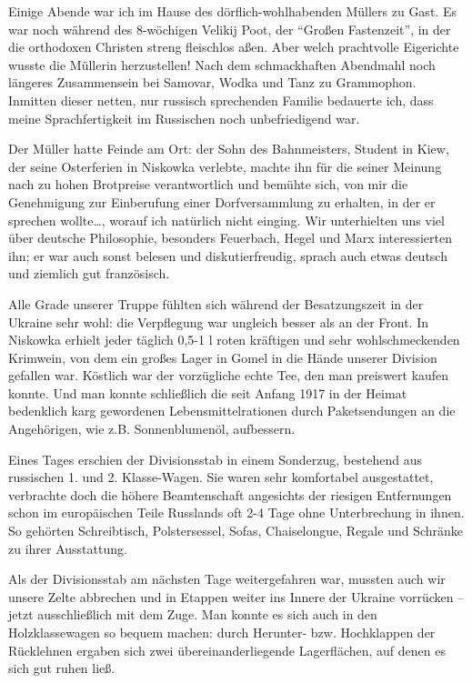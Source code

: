 Einige Abende war ich im Hause des dörflich-wohlhabenden Müllers zu Gast. Es war noch während des 8-wöchigen Velikij Poot, der \enquote{Großen Fastenzeit}, in der die orthodoxen Christen streng fleischlos aßen. Aber welch prachtvolle Eigerichte wusste die Müllerin herzustellen! Nach dem schmackhaften Abendmahl noch längeres Zusammensein bei Samovar, Wodka und Tanz zu Grammophon. Inmitten dieser netten, nur russisch sprechenden Familie bedauerte ich, dass meine Sprachfertigkeit im Russischen noch unbefriedigend war.

Der Müller hatte Feinde am Ort: der Sohn des Bahnmeisters, Student in Kiew, der seine Osterferien in Niskowka verlebte, machte ihn für die seiner Meinung nach zu hohen Brotpreise verantwortlich und bemühte sich, von mir die Genehmigung zur Einberufung einer Dorfversammlung zu erhalten, in der er sprechen wollte\dots, worauf ich natürlich nicht einging. Wir unterhielten uns viel über deutsche Philosophie, besonders Feuerbach, Hegel und Marx interessierten ihn; er war auch sonst belesen und diskutierfreudig, sprach auch etwas deutsch und ziemlich gut französisch.

Alle Grade unserer Truppe fühlten sich während der Besatzungszeit in der Ukraine sehr wohl: die Verpflegung war ungleich besser als an der Front. In Niskowka erhielt jeder täglich 0,5-1 l roten kräftigen und sehr wohlschmeckenden Krimwein, von dem ein großes Lager in Gomel in die Hände unserer Division gefallen war. Köstlich war der vorzügliche echte Tee, den man preiswert kaufen konnte. Und man konnte schließlich die seit Anfang 1917 in der Heimat bedenklich karg gewordenen Lebensmittelrationen durch Paketsendungen an die Angehörigen, wie z.B. Sonnenblumenöl, aufbessern.

Eines Tages erschien der Divisionsstab in einem Sonderzug, bestehend aus russischen 1. und 2. Klasse-Wagen. Sie waren sehr komfortabel ausgestattet, verbrachte doch die höhere Beamtenschaft angesichts der riesigen Entfernungen schon im europäischen Teile Russlands oft 2-4 Tage ohne Unterbrechung in ihnen. So gehörten Schreibtisch, Polstersessel, Sofas, Chaiselongue, Regale und Schränke zu ihrer Ausstattung.

Als der Divisionsstab am nächsten Tage weitergefahren war, mussten auch wir unsere Zelte abbrechen und in Etappen weiter ins Innere der Ukraine vorrücken -- jetzt ausschließlich mit dem Zuge. Man konnte es sich auch in den Holzklassewagen so bequem machen: durch Herunter- bzw. Hochklappen der Rücklehnen ergaben sich zwei übereinanderliegende Lagerflächen, auf denen es sich gut ruhen ließ.


